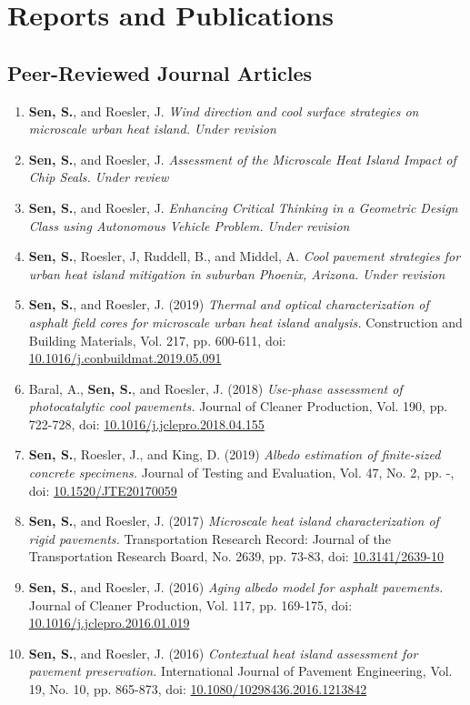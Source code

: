 \documentclass[12pt]{article}
\begin{document}
\section*{Reports and Publications}
\subsection*{Peer-Reviewed Journal Articles}
\begin{enumerate}[label=(J\arabic*)]
	\item \textbf{Sen, S.}, and Roesler, J. \textit{Wind direction and cool surface strategies on microscale urban heat island.}  \textit{Under revision}	
	\item \textbf{Sen, S.}, and Roesler, J. \textit{Assessment of the Microscale Heat Island Impact of Chip Seals.}  \textit{Under review}	
	\item \textbf{Sen, S.}, and Roesler, J. \textit{Enhancing Critical Thinking in a Geometric Design Class using Autonomous Vehicle Problem.}  \textit{Under revision}
	\item \textbf{Sen, S.}, Roesler, J, Ruddell, B., and Middel, A. \textit{Cool pavement strategies for urban heat island mitigation in suburban Phoenix, Arizona.}  \textit{Under revision}
		\item \textbf{Sen, S.}, and Roesler, J. (2019) \textit{Thermal and optical characterization of asphalt field cores for microscale urban heat island analysis.}  Construction and Building Materials, Vol. 217, pp. 600-611, doi: \href{https://doi.org/10.1016/j.conbuildmat.2019.05.091}{10.1016/j.conbuildmat.2019.05.091}
	\item Baral, A., \textbf{Sen, S.}, and Roesler, J. (2018) \textit{Use-phase assessment of photocatalytic cool pavements.}  Journal of Cleaner Production, Vol. 190, pp. 722-728, doi: \href{https://doi.org/10.1016/j.jclepro.2018.04.155}{10.1016/j.jclepro.2018.04.155}
	\item \textbf{Sen, S.}, Roesler, J., and King, D. (2019) \textit{Albedo estimation of finite-sized concrete specimens.} Journal of Testing and Evaluation, Vol. 47, No. 2, pp. -, doi: \href{https://doi.org/10.1520/JTE20170059}{10.1520/JTE20170059}
	\item \textbf{Sen, S.}, and Roesler, J. (2017) \textit{Microscale heat island characterization of rigid pavements.} Transportation Research Record: Journal of the Transportation Research Board, No. 2639, pp. 73-83, doi: \href{http://dx.doi.org/10.3141/2639-10}{10.3141/2639-10}
	\item \textbf{Sen, S.}, and Roesler, J. (2016) \textit{Aging albedo model for asphalt pavements.} Journal of Cleaner Production, Vol. 117, pp. 169-175, doi: \href{http://dx.doi.org/10.1016/j.jclepro.2016.01.019}{10.1016/j.jclepro.2016.01.019}
	\item \textbf{Sen, S.}, and Roesler, J. (2016) \textit{Contextual heat island assessment for pavement preservation.} International Journal of Pavement Engineering, Vol. 19, No. 10, pp. 865-873, doi: \href{https://www.tandfonline.com/doi/full/10.1080/10298436.2016.1213842}{10.1080/10298436.2016.1213842}
\end{enumerate}
\end{document}

